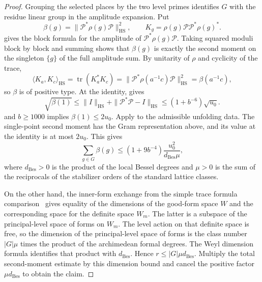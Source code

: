 \begin{proof}
Grouping the selected places by the two level primes identifies $G$ with the residue linear group in the amplitude expansion.
Put
\[
 \beta(g)=\|\mathcal P^*\rho(g)\mathcal P\|_{\mathrm{HS}}^2,
 \qquad
 K_g=\rho(g)\mathcal P\mathcal P^*\rho(g)^* .
\]
gives the block formula for the amplitude of $\mathcal P^*\rho(g)\mathcal P$.
Taking squared moduli block by block and summing shows that $\beta(g)$ is exactly the second moment on the singleton $\{g\}$
of the full amplitude sum.
By unitarity of $\rho$ and cyclicity of the trace,
\[
 \langle K_a,K_c\rangle_{\mathrm{HS}}
 =\operatorname{tr}(K_a^*K_c)
 =\|\mathcal P^*\rho(a^{-1}c)\mathcal P\|_{\mathrm{HS}}^2
 =\beta(a^{-1}c),
\]
so $\beta$ is of positive type. At the identity,  gives
\[
 \sqrt{\beta(1)}
 \le \|I\|_{\mathrm{HS}}+\|\mathcal P^*\mathcal P-I\|_{\mathrm{HS}}
 \le (1+b^{-6})\sqrt{u_0}.
\]
and $b\ge1000$ implies $\beta(1)\le 2u_0$. Apply  to the admissible unfolding data.
The single-point second moment has the Gram representation above, and its value at the identity is at most $2u_0$. This gives
\[
 \sum_{g\in G}\beta(g)
 \le (1+9b^{-4})\frac{u_0^2}{d_{\mathrm{Bes}}\mu},
\]
where $d_{\mathrm{Bes}}>0$ is the product of the local Bessel degrees and
$\mu>0$ is the sum of the reciprocals of the stabilizer orders of the standard lattice classes.

On the other hand, the inner-form exchange from the simple trace formula comparison~\cite{HarrisLabesse2004,Labesse2011} gives equality of the dimensions of the good-form space $W$ and the corresponding space for the definite space
$W_m$. The latter is a subspace of the principal-level space of forms on $W_m$.
The level action on that definite space is free, so the dimension of the principal-level space of forms is
the class number $|G|\mu$ times the product of the archimedean formal degrees.
The Weyl dimension formula identifies that product with $d_{\mathrm{Bes}}$.
Hence $r\le |G|\mu d_{\mathrm{Bes}}$.
Multiply the total second-moment estimate by this dimension bound and cancel the positive factor $\mu d_{\mathrm{Bes}}$ to obtain the claim.
\end{proof}

